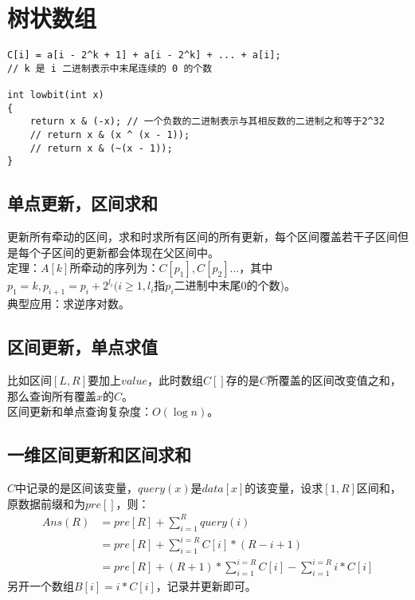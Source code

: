 \clearpage
\section{树状数组}

\begin{lstlisting}
C[i] = a[i - 2^k + 1] + a[i - 2^k] + ... + a[i];
// k 是 i 二进制表示中末尾连续的 0 的个数

int lowbit(int x)
{
    return x & (-x); // 一个负数的二进制表示与其相反数的二进制之和等于2^32
    // return x & (x ^ (x - 1));
    // return x & (~(x - 1));
}
\end{lstlisting}

\subsection{单点更新，区间求和}
更新所有牵动的区间，求和时求所有区间的所有更新，每个区间覆盖若干子区间但是每个子区间的更新都会体现在父区间中。\\

定理：$A[k]$所牵动的序列为：$C[p_1],C[p_2]...$，其中$p_1=k,p_{i+1}=p_{i}+2^{l_i}(i\geq 1,l_i$指$p_{i}$二进制中末尾0的个数)。\\

典型应用：求逆序对数。\\

\subsection{区间更新，单点求值}
比如区间$[L, R]$要加上$value$，此时数组$C[]$存的是$C$所覆盖的区间改变值之和，那么查询所有覆盖$x$的$C$。\\

区间更新和单点查询复杂度：$O(\log n)$。\\
\subsection{一维区间更新和区间求和}
$C$中记录的是区间该变量，$query(x)$是$data[x]$的该变量，设求$[1, R]$区间和，原数据前缀和为$pre[]$，则：
$$
\begin{aligned}
Ans(R)&=pre[R]+\sum_{i=1}^{R}{query(i)} \\
&=pre[R]+\sum_{i=1}^{i=R}{C[i]*(R-i+1)} \\
&=pre[R]+(R+1)*\sum_{i=1}^{i=R}C[i] - \sum_{i=1}^{i=R}{i*C[i]}
\end{aligned}
$$
另开一个数组$B[i]=i*C[i]$，记录并更新即可。

